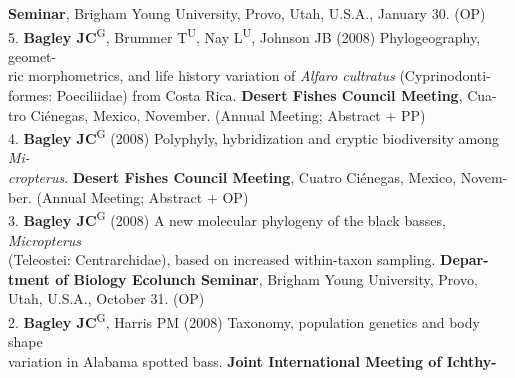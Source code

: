 \documentclass[margin,line]{res}
\begin{document}
\begin{resume}
\hspace*{8mm}\textbf{Seminar}, Brigham Young University, Provo, Utah, U.S.A., January 30. (OP) \\
5. \textbf{Bagley JC}\textsuperscript{G}, Brummer T\textsuperscript{U}, Nay L\textsuperscript{U}, Johnson JB (2008) Phylogeography, geomet-\\
\hspace*{8mm} ric morphometrics, and life history variation of \emph{Alfaro cultratus} (Cyprinodonti-\\
\hspace*{8mm} formes: Poeciliidae) from Costa Rica. \textbf{Desert Fishes Council Meeting}, Cua-\\ \vspace{2mm}
\hspace*{8mm}tro Ci\'{e}negas, Mexico, November. (Annual Meeting; Abstract + PP) \\
4. \textbf{Bagley JC}\textsuperscript{G} (2008) Polyphyly, hybridization and cryptic biodiversity among \emph{Mi-}\\
\hspace*{8mm} \emph{cropterus}. \textbf{Desert Fishes Council Meeting}, Cuatro Ci\'{e}negas, Mexico, Novem-\\ \vspace{2mm}
\hspace*{8mm}ber. (Annual Meeting; Abstract + OP) \\
3. \textbf{Bagley JC}\textsuperscript{G} (2008) A new molecular phylogeny of the black basses, \emph{Micropterus}\\
\hspace*{8mm} (Teleostei: Centrarchidae), based on increased within-taxon sampling. \textbf{Depar-}\\
\hspace*{8mm} \textbf{tment of Biology Ecolunch Seminar}, Brigham Young University, Provo,\\ \vspace{2mm}
\hspace*{8mm}Utah, U.S.A., October 31. (OP) \\
2. \textbf{Bagley JC}\textsuperscript{G}, Harris PM (2008) Taxonomy, population genetics and body shape\\
\hspace*{8mm} variation in Alabama spotted bass. \textbf{Joint International Meeting of Ichthy-}\\

\end{resume}
\end{document}
